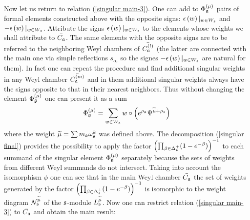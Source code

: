 \documentclass[12pt]{article}
\begin{document}
Now let us return to relation (\ref{singular main-3}). One can add to $%
\Phi _{\frak{g}}^{\left( \mu \right) }$ pairs of formal elements
constructed above  with the opposite signs: $\epsilon \left( w\right)
|_{w\in W_{\frak{s}}}$ and $-\epsilon \left( w\right) |_{w\in W_{\frak{s}}}$. 
Attribute the signs $\epsilon \left( w\right) |_{w\in W_{\frak{s}}}$ to
the elements whose weights we shall attribute to $\bar{C_{\frak{a}}}$. 
The same elements with the opposite signs are to be referred to the
neighboring Weyl chambers of $\bar{C_{\frak{a}}^{(l)}}$ (the latter are
connected with the main one via simple reflections $s_{\alpha _{l}}$ so the
signes $-\epsilon \left( w\right) |_{w\in W_{\frak{s}}}$ are natural for
them). In fact one can repeat the procedure and find additional singular
weights in any Weyl chamber $\bar{C_{\frak{a}}^{(m)}}$ and in them
additional singular weights always have the signs opposite to that in their
nearest neighbors. Thus without changing the element $\Phi _{\frak{g}%
}^{\left( \mu \right) }$ one can present it as a sum
\begin{equation}
\Phi _{\frak{g}}^{\left( \mu \right) }=\sum_{w\in W_{\frak{a}}}w\circ \left(
e^{\rho _{\frak{a}}}\Psi ^{\widetilde{\mu }+\rho _{\frak{s}}}\right)
\label{singular final}
\end{equation}
where the weight $\widetilde{\mu }=\sum m_{k}\omega _{\frak{s}}^{k}$ was
defined above. The decomposition (\ref{singular final}) provides the
possibility to apply the factor $\left( \prod_{\beta \in \Delta _{\frak{s}%
}^{+}}(1-e^{-\beta })\right) ^{-1}$ to each summand of the singular element $%
\Phi _{\frak{g}}^{\left( \mu \right) }$ separately because the sets of
weights from different Weyl summands do not intersect. Taking into account
the isomorphism $\phi $ one can see that in the main Weyl chamber $\bar{C_{%
\frak{a}}}$ the set of weights generated by the factor $\left( \prod_{\beta
\in \Delta _{\frak{s}}^{+}}(1-e^{-\beta })\right) ^{-1}$ is isomorphic to
the weight diagram $\mathcal{N}_{\frak{s}}^{\widetilde{\mu }}$ of the $\frak{%
s}$-module $L_{\frak{s}}^{\widetilde{\mu }}$. Now one can restrict
relation (\ref{singular main-3}) to $\bar{C_{\frak{a}}}$ and obtain the main
result:
\end{document}
